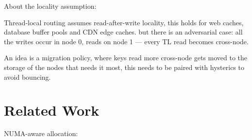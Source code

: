 \documentclass[sigplan,10pt]{acmart}
\begin{document}
%
About the locality assumption:

Thread-local routing assumes read-after-write locality, 
this holds for web caches, database buffer pools and CDN edge caches.
but there is an adversarial case: all the writes occur in node 0, reads on node 1 --- every TL read becomes cross-node.

An idea is a migration policy, where keys read more cross-node gets moved to the storage of the nodes that needs it most,
this needs to be paired with hysterics to avoid bouncing.

%
%

\section{Related Work}
\label{sec:related}

%
NUMA-aware allocation:
\end{document}
